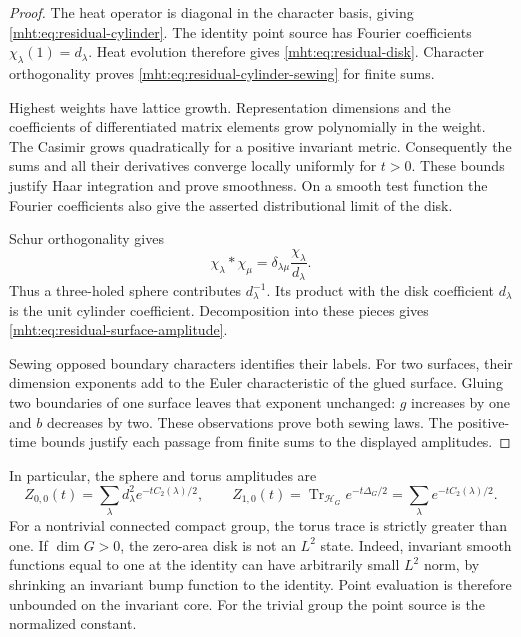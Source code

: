 \begin{proof}
The heat operator is diagonal in the character basis, giving
\eqref{mht:eq:residual-cylinder}. The identity point source has
Fourier coefficients $\chi_\lambda(1)=d_\lambda$.
Heat evolution therefore gives \eqref{mht:eq:residual-disk}.
Character orthogonality proves
\eqref{mht:eq:residual-cylinder-sewing} for finite sums.

Highest weights have lattice growth. Representation dimensions
and the coefficients of differentiated matrix elements grow
polynomially in the weight. The Casimir grows quadratically
for a positive invariant metric. Consequently the sums and
all their derivatives converge locally uniformly for $t>0$.
These bounds justify Haar integration and prove smoothness.
On a smooth test function the Fourier coefficients also give
the asserted distributional limit of the disk.

Schur orthogonality gives
\[
 \chi_\lambda*\chi_\mu
       =\delta_{\lambda\mu}\frac{\chi_\lambda}{d_\lambda}.
\]
Thus a three-holed sphere contributes $d_\lambda^{-1}$.
Its product with the disk coefficient $d_\lambda$ is the
unit cylinder coefficient. Decomposition into these pieces
gives \eqref{mht:eq:residual-surface-amplitude}.

Sewing opposed boundary characters identifies their labels.
For two surfaces, their dimension exponents add to the Euler
characteristic of the glued surface. Gluing two boundaries of
one surface leaves that exponent unchanged: $g$ increases by
one and $b$ decreases by two. These observations prove both
sewing laws. The positive-time bounds justify each passage
from finite sums to the displayed amplitudes.
\end{proof}

In particular, the sphere and torus amplitudes are
\begin{equation}\label{mht:eq:residual-closed-amplitudes}
 Z_{0,0}(t)=\sum_\lambda d_\lambda^2e^{-tC_2(\lambda)/2},
 \qquad
 Z_{1,0}(t)=\operatorname{Tr}_{\mathcal H_G}e^{-t\Delta_G/2}
           =\sum_\lambda e^{-tC_2(\lambda)/2}.
\end{equation}
For a nontrivial connected compact group, the torus trace is
strictly greater than one. If $\dim G>0$, the zero-area disk
is not an $L^2$ state. Indeed, invariant smooth functions equal
to one at the identity can have arbitrarily small $L^2$ norm,
by shrinking an invariant bump function to the identity.
Point evaluation is therefore unbounded on the invariant core.
For the trivial group the point source is the normalized constant.

